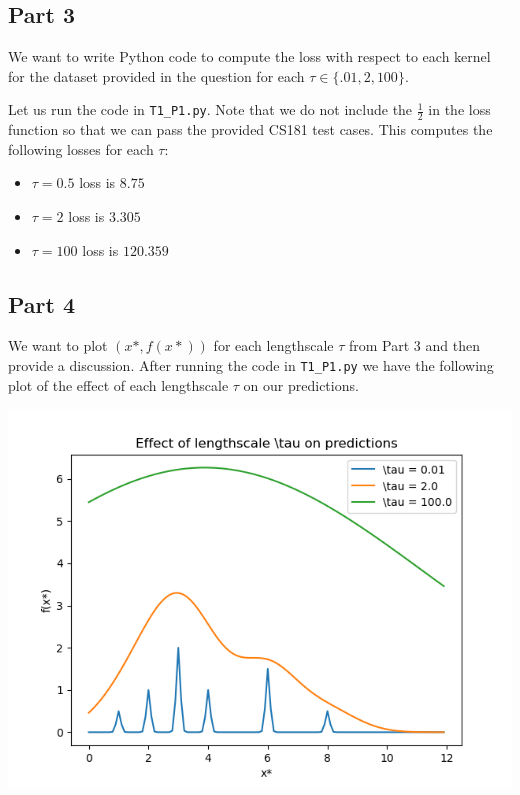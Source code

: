 \documentclass[submit]{harvardml}
\begin{document}
\newpage
\subsection{Part 3}

We want to write Python code to compute the loss with respect to each kernel for the dataset provided in the question for each $\tau \in \{.01, 2, 100\}$.

Let us run the code in \verb+T1_P1.py+. Note that we do not include the $\frac{1}{2}$ in the loss function so that we can pass the provided CS181 test cases.
This computes the following losses for each $\tau$:
\begin{itemize}
    \item $\tau = 0.5$ loss is $8.75$
    \item $\tau = 2$ loss is $3.305$
    \item $\tau = 100$ loss is $120.359$
\end{itemize}

\subsection{Part 4}

We want to plot $(x*, f(x*))$ for each lengthscale $\tau$ from Part 3 and then provide a discussion. After running the code in \verb+T1_P1.py+ we have the following plot of the effect of each lengthscale $\tau$ on our predictions.

\begin{center}
    \includegraphics[scale=0.75]{lengthscales.png}
\end{center}
\end{document}
